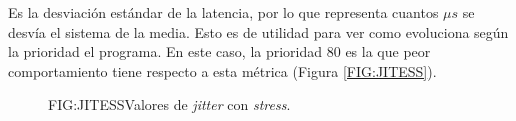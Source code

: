
Es la desviación estándar de la latencia, por lo que representa cuantos $\mu s$ se desvía el sistema de la media. Esto es de utilidad para ver como evoluciona según la prioridad el programa. En este caso, la prioridad $80$ es la que peor comportamiento tiene respecto a esta métrica (Figura \ref{FIG:JITESS}).

\begin{figure}[Jitter con estrés]{FIG:JITESS}{Valores de \textit{jitter} con \textit{stress}.}
\end{figure}


